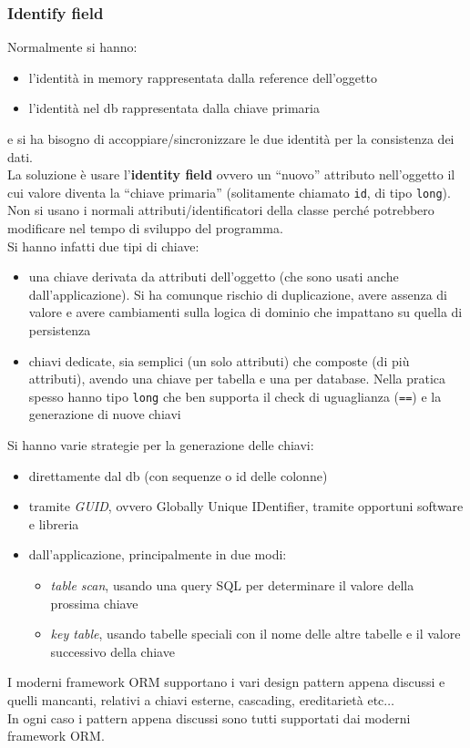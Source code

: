 \documentclass[a4paper,12pt, oneside]{book}
\begin{document}
\subsubsection{Identify field}
Normalmente si hanno:
\begin{itemize}
  \item l'identità in memory rappresentata dalla reference dell'oggetto
  \item l'identità nel db rappresentata dalla chiave primaria
\end{itemize}
e si ha bisogno di accoppiare/sincronizzare le due identità per la consistenza
dei dati.\\ 
La soluzione è usare l'\textbf{identity field} ovvero un ``nuovo'' attributo
nell'oggetto il cui valore diventa la ``chiave primaria'' (solitamente chiamato
\texttt{id}, di tipo \texttt{long}). Non si 
usano i normali attributi/identificatori della classe perché potrebbero
modificare nel tempo di sviluppo del programma.\\
Si hanno infatti due tipi di chiave:
\begin{itemize}
  \item una chiave derivata da attributi dell'oggetto (che sono usati anche
  dall'applicazione). Si ha comunque rischio di duplicazione, avere assenza di
  valore e avere cambiamenti sulla logica di dominio che impattano su quella di
  persistenza  
  \item chiavi dedicate, sia semplici (un solo attributi) che composte (di più
  attributi), avendo una chiave per tabella e una per database. Nella pratica
  spesso hanno tipo \texttt{long} che ben supporta il check di uguaglianza
  (\texttt{==}) e la generazione di nuove chiavi
\end{itemize}
Si hanno varie strategie per la generazione delle chiavi:
\begin{itemize}
  \item direttamente dal db (con sequenze o id delle colonne)
  \item tramite \textit{GUID}, ovvero Globally Unique IDentifier, tramite
  opportuni software e libreria
  \item dall'applicazione, principalmente in due modi:
  \begin{itemize}
    \item \textit{table scan}, usando una query SQL per determinare il valore
    della prossima chiave
    \item \textit{key table}, usando tabelle speciali con il nome delle altre
    tabelle e il valore successivo della chiave
  \end{itemize}
\end{itemize}
I moderni framework ORM supportano i vari design pattern appena discussi
e quelli mancanti, relativi a chiavi esterne, cascading, ereditarietà
etc$\ldots$ \\
In ogni caso i pattern appena discussi sono tutti supportati dai moderni
framework ORM. 
\end{document}
